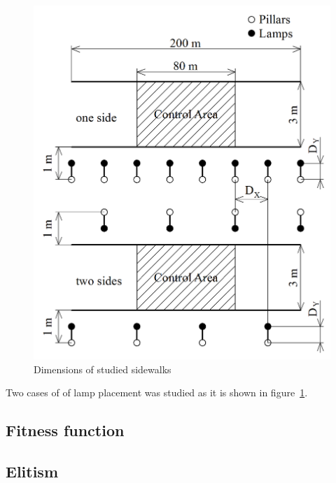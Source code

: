\begin{figure}[htb]
  \centering
  \includegraphics[width=\columnwidth]{kotyChodniku}
  \caption{Dimensions of studied sidewalks}
  \label{fig:sidewalk}
\end{figure}

Two cases of of lamp placement was studied as it is shown in figure~\ref{fig:sidewalk}.

\subsection{Fitness function}
\subsection{Elitism}
